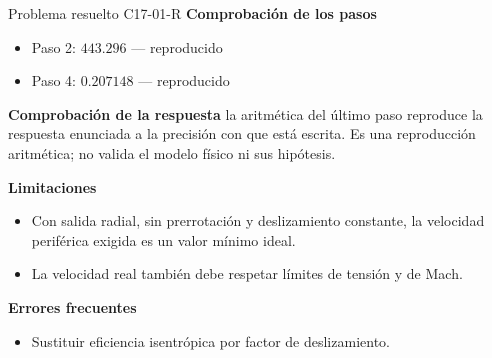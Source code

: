 \documentclass[10pt,openany]{book}
\begin{document}
\begin{studiumworked}{Problema resuelto C17-01-R}
\noindent\textbf{Comprobación de los pasos}
\begin{itemize}
\item Paso 2: $443.296$ — reproducido
\item Paso 4: $0.207148$ — reproducido
\end{itemize}

\noindent\textbf{Comprobación de la respuesta} la aritmética del último paso reproduce la respuesta enunciada a la precisión con que está escrita. Es una reproducción aritmética; no valida el modelo físico ni sus hipótesis.

\noindent\textbf{Limitaciones}
\begin{itemize}
\item Con salida radial, sin prerrotación y deslizamiento constante, la velocidad periférica exigida es un valor mínimo ideal.
\item La velocidad real también debe respetar límites de tensión y de Mach.
\end{itemize}

\noindent\textbf{Errores frecuentes}
\begin{itemize}
\item Sustituir eficiencia isentrópica por factor de deslizamiento.
\end{itemize}
\end{studiumworked}
\end{document}
